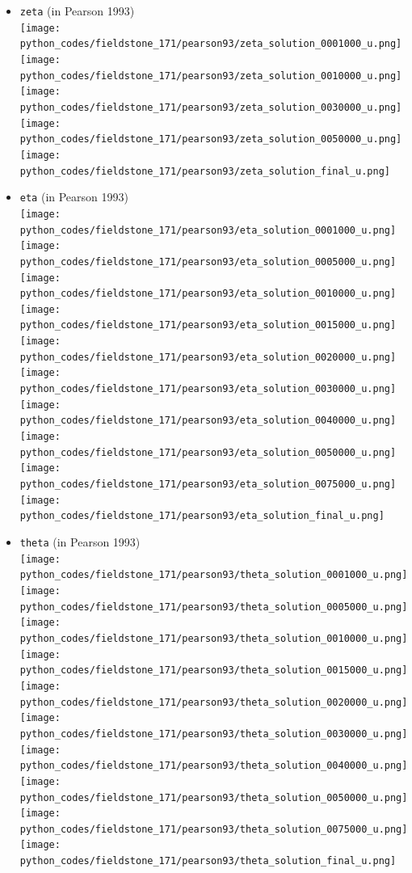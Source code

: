 \begin{itemize}
\item {\tt zeta} (in Pearson 1993)\\
\texttt{[image: python\_codes/fieldstone\_171/pearson93/zeta\_solution\_0001000\_u.png]}
\texttt{[image: python\_codes/fieldstone\_171/pearson93/zeta\_solution\_0010000\_u.png]}
\texttt{[image: python\_codes/fieldstone\_171/pearson93/zeta\_solution\_0030000\_u.png]}
\texttt{[image: python\_codes/fieldstone\_171/pearson93/zeta\_solution\_0050000\_u.png]}
\texttt{[image: python\_codes/fieldstone\_171/pearson93/zeta\_solution\_final\_u.png]}


\item {\tt eta} (in Pearson 1993)\\
\texttt{[image: python\_codes/fieldstone\_171/pearson93/eta\_solution\_0001000\_u.png]}
\texttt{[image: python\_codes/fieldstone\_171/pearson93/eta\_solution\_0005000\_u.png]}
\texttt{[image: python\_codes/fieldstone\_171/pearson93/eta\_solution\_0010000\_u.png]}
\texttt{[image: python\_codes/fieldstone\_171/pearson93/eta\_solution\_0015000\_u.png]}
\texttt{[image: python\_codes/fieldstone\_171/pearson93/eta\_solution\_0020000\_u.png]}
\texttt{[image: python\_codes/fieldstone\_171/pearson93/eta\_solution\_0030000\_u.png]}
\texttt{[image: python\_codes/fieldstone\_171/pearson93/eta\_solution\_0040000\_u.png]}
\texttt{[image: python\_codes/fieldstone\_171/pearson93/eta\_solution\_0050000\_u.png]}
\texttt{[image: python\_codes/fieldstone\_171/pearson93/eta\_solution\_0075000\_u.png]}
\texttt{[image: python\_codes/fieldstone\_171/pearson93/eta\_solution\_final\_u.png]}

\item {\tt theta} (in Pearson 1993)\\
\texttt{[image: python\_codes/fieldstone\_171/pearson93/theta\_solution\_0001000\_u.png]}
\texttt{[image: python\_codes/fieldstone\_171/pearson93/theta\_solution\_0005000\_u.png]}
\texttt{[image: python\_codes/fieldstone\_171/pearson93/theta\_solution\_0010000\_u.png]}
\texttt{[image: python\_codes/fieldstone\_171/pearson93/theta\_solution\_0015000\_u.png]}
\texttt{[image: python\_codes/fieldstone\_171/pearson93/theta\_solution\_0020000\_u.png]}
\texttt{[image: python\_codes/fieldstone\_171/pearson93/theta\_solution\_0030000\_u.png]}
\texttt{[image: python\_codes/fieldstone\_171/pearson93/theta\_solution\_0040000\_u.png]}
\texttt{[image: python\_codes/fieldstone\_171/pearson93/theta\_solution\_0050000\_u.png]}
\texttt{[image: python\_codes/fieldstone\_171/pearson93/theta\_solution\_0075000\_u.png]}
\texttt{[image: python\_codes/fieldstone\_171/pearson93/theta\_solution\_final\_u.png]}










\end{itemize}
